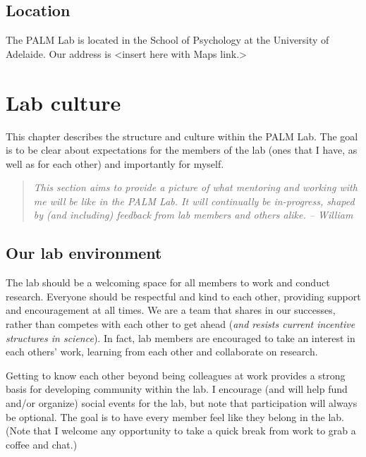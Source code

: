 \documentclass[
]{book}
\begin{document}
\hypertarget{location}{%
\section{Location}\label{location}}

The PALM Lab is located in the School of Psychology at the University of Adelaide. Our address is \textless insert here with Maps link.\textgreater{}

\hypertarget{lab-culture}{%
\chapter{Lab culture}\label{lab-culture}}

This chapter describes the structure and culture within the PALM Lab. The goal is to be clear about expectations for the members of the lab (ones that I have, as well as for each other) and importantly for myself.

\begin{quote}
\emph{This section aims to provide a picture of what mentoring and working with me will be like in the PALM Lab. It will continually be in-progress, shaped by (and including) feedback from lab members and others alike. -- William}
\end{quote}

\hypertarget{lab-environment}{%
\section{Our lab environment}\label{lab-environment}}

The lab should be a welcoming space for all members to work and conduct research. Everyone should be respectful and kind to each other, providing support and encouragement at all times. We are a team that shares in our successes, rather than competes with each other to get ahead (\emph{and resists current incentive structures in science}). In fact, lab members are encouraged to take an interest in each others' work, learning from each other and collaborate on research.

Getting to know each other beyond being colleagues at work provides a strong basis for developing community within the lab. I encourage (and will help fund and/or organize) social events for the lab, but note that participation will always be optional. The goal is to have every member feel like they belong in the lab. (Note that I welcome any opportunity to take a quick break from work to grab a coffee and chat.)
\end{document}
